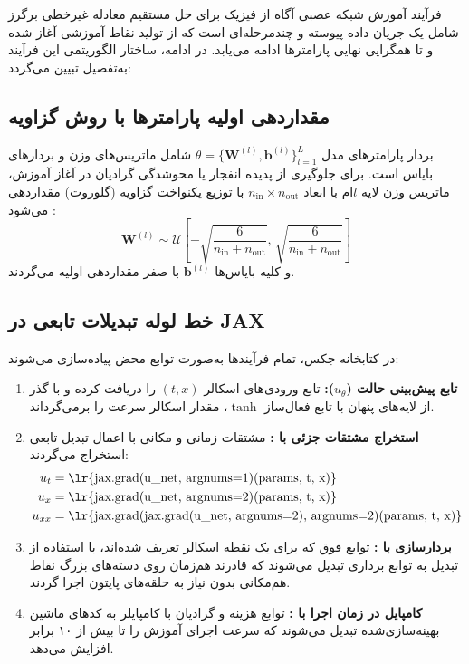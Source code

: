 فرآیند آموزش شبکه عصبی آگاه از فیزیک برای حل مستقیم معادله غیرخطی برگرز شامل یک جریان داده پیوسته و چندمرحله‌ای است که از تولید نقاط آموزشی آغاز شده و تا همگرایی نهایی پارامترها ادامه می‌یابد. در ادامه، ساختار الگوریتمی این فرآیند به‌تفصیل تبیین می‌گردد:

\subsection{مقداردهی اولیه پارامترها با روش گزاویه}
بردار پارامترهای مدل $\theta = \{\mathbf{W}^{(l)}, \mathbf{b}^{(l)}\}_{l=1}^L$ شامل ماتریس‌های وزن و بردارهای بایاس است. برای جلوگیری از پدیده انفجار یا محوشدگی گرادیان در آغاز آموزش، ماتریس وزن لایه $l$ام با ابعاد $n_{\text{in}} \times n_{\text{out}}$ با توزیع یکنواخت گزاویه (گلوروت) مقداردهی می‌شود \cite{glorot2010}:
\begin{equation}
\mathbf{W}^{(l)} \sim \mathcal{U}\left[-\sqrt{\frac{6}{n_{\text{in}} + n_{\text{out}}}},\, \sqrt{\frac{6}{n_{\text{in}} + n_{\text{out}}}}\right]
\end{equation}
و کلیه بایاس‌ها $\mathbf{b}^{(l)}$ با صفر مقداردهی اولیه می‌گردند.

\subsection{خط لوله تبدیلات تابعی در JAX}
در کتابخانه جکس، تمام فرآیندها به‌صورت توابع محض پیاده‌سازی می‌شوند:
\begin{enumerate}
\item \textbf{تابع پیش‌بینی حالت ($u_\theta$):} تابع  ورودی‌های اسکالر $(t,x)$ را دریافت کرده و با گذر از لایه‌های پنهان با تابع فعال‌ساز $\tanh$، مقدار اسکالر سرعت را برمی‌گرداند.
\item \textbf{استخراج مشتقات جزئی با :} مشتقات زمانی و مکانی با اعمال تبدیل تابعی استخراج می‌گردند:
\begin{equation}
\begin{aligned}
u_t &= \text{\lr{jax.grad(u\_net, argnums=1)(params, t, x)}} \\
u_x &= \text{\lr{jax.grad(u\_net, argnums=2)(params, t, x)}} \\
u_{xx} &= \text{\lr{jax.grad(jax.grad(u\_net, argnums=2), argnums=2)(params, t, x)}}
\end{aligned}
\end{equation}
\item \textbf{بردارسازی با :} توابع فوق که برای یک نقطه اسکالر تعریف شده‌اند، با استفاده از تبدیل  به توابع برداری تبدیل می‌شوند که قادرند هم‌زمان روی دسته‌های بزرگ نقاط هم‌مکانی بدون نیاز به حلقه‌های پایتون اجرا گردند.
\item \textbf{کامپایل در زمان اجرا با :} توابع هزینه و گرادیان با کامپایلر  به کدهای ماشین بهینه‌سازی‌شده تبدیل می‌شوند که سرعت اجرای آموزش را تا بیش از ۱۰ برابر افزایش می‌دهد.
\end{enumerate}

